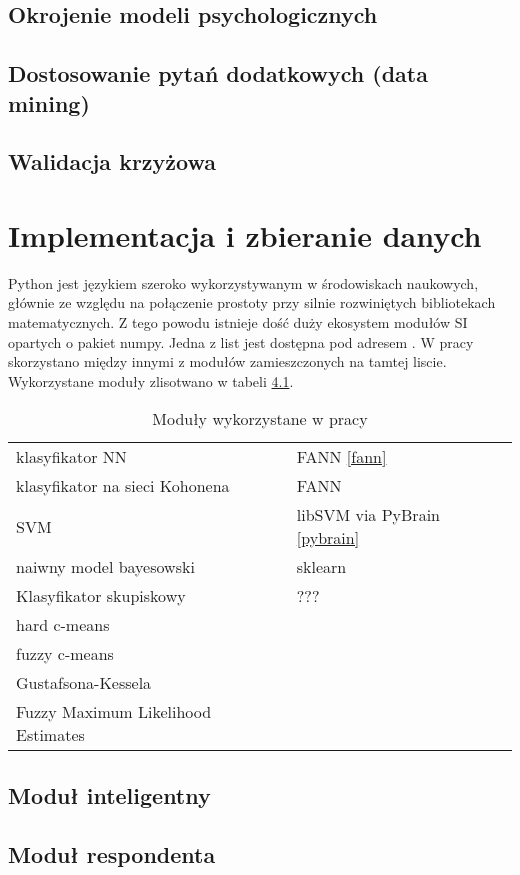 \documentclass[12pt,a4paper,oneside]{report} %
\begin{document}
\section{Okrojenie modeli psychologicznych}
\section{Dostosowanie pytań dodatkowych (data mining)}
\section{Walidacja krzyżowa}
\chapter{Implementacja i zbieranie danych}
Python jest językiem szeroko wykorzystywanym w środowiskach naukowych, głównie ze względu na połączenie prostoty przy silnie rozwiniętych bibliotekach matematycznych. Z tego powodu istnieje dość duży ekosystem modułów SI opartych o pakiet numpy. Jedna z list jest dostępna pod adresem \cite{pythonwiki}. W pracy skorzystano między innymi z modułów zamieszczonych na tamtej liscie. Wykorzystane moduły zlisotwano w tabeli \ref{table:modules}.\par

\begin{table}
\centering
\begin{tabular}{|l|l|}
\toprule
klasyfikator NN & FANN \ref{fann}\\
    klasyfikator na sieci Kohonena & FANN\\
    SVM & libSVM via PyBrain \ref{pybrain}\\
    naiwny model bayesowski & sklearn \\
    Klasyfikator skupiskowy & ??? \\
    hard c-means &  \\
    fuzzy c-means & \\
    Gustafsona-Kessela & \\
    Fuzzy Maximum Likelihood Estimates & \\
\bottomrule
\end{tabular}
\label{table:modules}
\caption{Moduły wykorzystane w pracy}
\end{table}
\section{Moduł inteligentny}
\section{Moduł respondenta}
\end{document}
